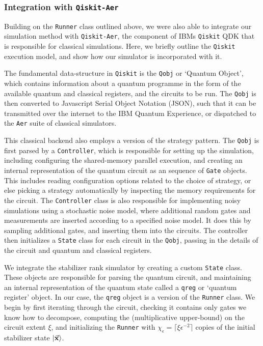 \subsubsection*{Integration with \texttt{Qiskit-Aer}}
Building on the \texttt{Runner} class outlined above, we were also able to integrate our simulation method with \texttt{Qiskit-Aer}, the component of IBMs \texttt{Qiskit} QDK that is responsible for classical simulations. Here, we briefly outline the \texttt{Qiskit} execution model, and show how our simulator is incorporated with it.\par
The fundamental data-structure in \texttt{Qiskit} is the \texttt{Qobj} or `Quantum Object', which contains information about a quantum programme in the form of the available quantum and classical registers, and the circuits to be run. The \texttt{Qobj} is then converted to Javascript Serial Object Notation (JSON), such that it can be transmitted over the internet to the IBM Quantum Experience, or dispatched to the \texttt{Aer} suite of classical simulators.\par 
This classical backend also employs a version of the strategy pattern. The \texttt{Qobj} is first parsed by a \texttt{Controller}, which is responsible for setting up the simulation, including configuring the shared-memory parallel execution, and creating an internal representation of the quantum circuit as an sequence of \texttt{Gate} objects. This includes reading configuration options related to the choice of strategy, or else picking a strategy automatically by inspecting the memory requirements for the circuit. The \texttt{Controller} class is also responsible for implementing noisy simulations using a stochastic noise model, where additional random gates and measurements are inserted according to a specified noise model. It does this by sampling additional gates, and inserting them into the circuits. The controller then initializes a \texttt{State} class for each circuit in the \texttt{Qobj}, passing in the details of the circuit and quantum and classical registers. \par
We integrate the stabilizer rank simulator by creating a custom \texttt{State} class. These objects are responsible for parsing the quantum circuit, and maintaining an internal representation of the quantum state called a \texttt{qreg} or `quantum register' object. In our case, the \texttt{qreg} object is a version of the \texttt{Runner} class. We begin by first iterating through the circuit, checking it contains only gates we know how to decompose, computing the (multiplicative upper-bound) on the circuit extent $\xi$, and initializing the \texttt{Runner} with $\chi_{\epsilon}=\lceil \xi \epsilon^{-2}\rceil$ copies of the initial stabilizer state $\ket{\va{x}}$.\par
